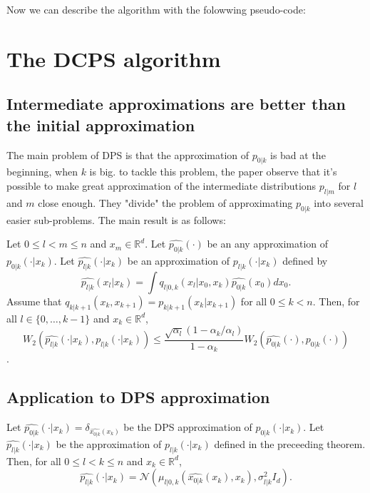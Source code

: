\documentclass[12pt]{article}
\begin{document}
Now we can describe the algorithm with the folowwing pseudo-code:

\section{The DCPS algorithm}

\subsection{Intermediate approximations are better than the initial approximation}
The main problem of DPS is that the approximation of $p_{0|k}$ is bad at the beginning, when $k$ is big. 
to tackle this problem, the paper observe that it's possible to make great approximation of the 
intermediate distributions $p_{l|m}$ for $l$ and $m$ close enough. They "divide" the problem 
of approximating $p_{0|k}$ into several easier sub-problems. The main result is as follows:

\begin{theorem}
    \label{th:intermediate_wasserstein}
    Let $0 \leq l < m \leq n$ and $x_m \in \mathbb{R}^d$.
    Let $\hat{p_{0|k}}(\cdot)$ be an any approximation of $p_{0|k}(\cdot | x_k)$.
    Let $\hat{p_{l|k}}(\cdot | x_k)$ be an approximation of $p_{l|k}(\cdot | x_k)$ defined by
    $$\hat{p_{l|k}}(x_l | x_k) = \int q_{l|0,k}(x_l | x_0, x_k) \hat{p_{0|k}}(x_0) dx_0.$$
    Assume that $q_{k|k+1}(x_k, x_{k+1}) = p_{k|k+1}(x_k | x_{k+1})$ for all $0 \leq k < n$.
    Then, for all $l \in \{0, \dots, k-1\}$ and $x_k \in \mathbb{R}^d$,
     $$W_2(\hat{p_{l|k}}(\cdot | x_k), p_{l|k}(\cdot | x_k)) 
     \leq \frac{\sqrt{\alpha_l}(1-\alpha_k/\alpha_l)}{1-\alpha_k} W_2(\hat{p_{0|k}}(\cdot), p_{0|k}(\cdot))$$.
\end{theorem}

\subsection{Application to DPS approximation}

\begin{application}
    Let  
    $\hat{p_{0|k}}(\cdot | x_k) = \delta_{\hat{x_{0|k}}(x_k)}$ 
    be the DPS approximation of $p_{0|k}(\cdot | x_k)$.
    Let $\hat{p_{l|k}}(\cdot | x_k)$ be the approximation of $p_{l|k}(\cdot | x_k)$ defined in the preceeding theorem.
    Then, for all $0 \leq l < k \leq n$ and $x_k \in \mathbb{R}^d$,
    $$\hat{p_{l|k}}(\cdot | x_k)  = 
    \mathcal{N}\left(\mu_{l|0,k}(\hat{x_{0|k}}(x_k), x_k), \sigma_{l|k}^2 I_d \right).$$
    
\end{application}
\end{document}
